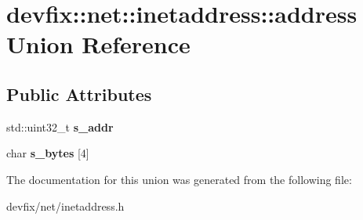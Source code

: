 \hypertarget{uniondevfix_1_1net_1_1inetaddress_1_1address}{}\section{devfix\+:\+:net\+:\+:inetaddress\+:\+:address Union Reference}
\label{uniondevfix_1_1net_1_1inetaddress_1_1address}
\subsection*{Public Attributes}
\begin{DoxyCompactItemize}
\item 
\mbox{\label{uniondevfix_1_1net_1_1inetaddress_1_1address_a4b43c8addd428389334ecc90eda802d0}} 
std\+::uint32\+\_\+t {\bfseries s\+\_\+addr}
\item 
\mbox{\label{uniondevfix_1_1net_1_1inetaddress_1_1address_a4dec3bb1439fd98072f89f7685c177a2}} 
char {\bfseries s\+\_\+bytes} \mbox{[}4\mbox{]}
\end{DoxyCompactItemize}


The documentation for this union was generated from the following file\+:\begin{DoxyCompactItemize}
\item 
devfix/net/inetaddress.\+h\end{DoxyCompactItemize}
